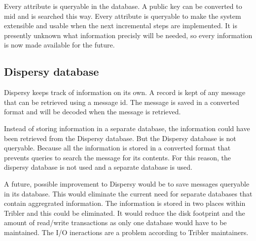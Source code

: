 Every attribute is queryable in the database.
A public key can be converted to mid and is searched this way.
Every attribute is queryable to make the system  extensible
and usable when the next incremental steps are implemented.
It is presently unknown what information precisly will be needed,
so every information is now made available for the future.

\subsection{Dispersy database}
Dispersy keeps track of information on its own.
A record is kept of any message that can be retrieved using a message id.
The message is saved in a converted format and will be decoded when the message is retrieved.

Instead of storing information in a separate database,
the information could have been retrieved from the Dispersy database.
But the Dispersy database is not queryable.
Because all the information is stored in a converted format
that prevents queries to search the message for its contents.
For this reason, the dispersy database is not used and a separate database is used.

A future, possible improvement to Dispersy would be to save messages queryable in its database.
This would eliminate the current need for separate databases that contain aggregrated information.
The information is stored in two places within Tribler and this could be eliminated.
It would reduce the disk footprint and the amount of read/write transactions
as only one database would have to be maintained.
The I/O ineractions are a problem according to Tribler maintainers.